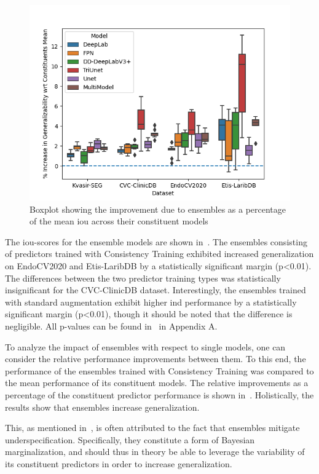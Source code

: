 \begin{figure}[htb]
    \centering
    \includegraphics[width=\linewidth]{illustrations/improvements_due_to_ensembles.png}
    \caption[Improvements due to Ensembles]{Boxplot showing the improvement due to ensembles as a percentage of the mean \gls{iou} across their constituent models}
    \label{fig:ensemble_improvements}
\end{figure}
The \gls{iou}-scores for the ensemble models are shown in~. The ensembles consisting of predictors trained with Consistency Training exhibited increased generalization on EndoCV2020 and Etis-LaribDB by a statistically significant margin (p<0.01). The differences between the two predictor training types was statistically insignificant for the CVC-ClinicDB dataset. Interestingly, the ensembles trained with standard augmentation exhibit higher \gls{ind} performance by a statistically significant margin (p<0.01), though it should be noted that the difference is negligible. All p-values can be found in~ in Appendix A. 

To analyze the impact of ensembles with respect to single models, one can consider the relative performance improvements between them. To this end, the performance of the ensembles trained with Consistency Training was compared to the mean performance of its constituent models. The relative improvements as a percentage of the constituent predictor performance is shown in~. Holistically, the results show that ensembles increase generalization. 

This, as mentioned in~, is often attributed to the fact that ensembles mitigate underspecification. Specifically, they constitute a form of Bayesian marginalization, and should thus in theory be able to leverage the variability of its constituent predictors in order to increase generalization.

